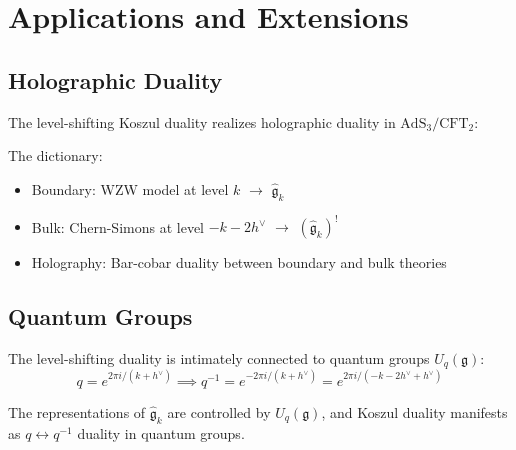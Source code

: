 \section{Applications and Extensions}

\subsection{Holographic Duality}

\begin{theorem}\label{thm:km-holography}
The level-shifting Koszul duality realizes holographic duality in $\mathrm{AdS}_3/\mathrm{CFT}_2$:
\begin{center}
\end{center}

The dictionary:
\begin{itemize}
\item Boundary: WZW model at level $k$ $\to$ $\widehat{\mathfrak{g}}_k$
\item Bulk: Chern-Simons at level $-k-2h^\vee$ $\to$ $(\widehat{\mathfrak{g}}_k)^!$
\item Holography: Bar-cobar duality between boundary and bulk theories
\end{itemize}
\end{theorem}

\subsection{Quantum Groups}

\begin{theorem}
The level-shifting duality is intimately connected to quantum groups $U_q(\mathfrak{g})$:
\begin{equation}
q = e^{2\pi i/(k+h^\vee)} \implies q^{-1} = e^{-2\pi i/(k+h^\vee)} = e^{2\pi i/(-k-2h^\vee+h^\vee)}
\end{equation}

The representations of $\widehat{\mathfrak{g}}_k$ are controlled by $U_q(\mathfrak{g})$, and Koszul duality manifests as $q \leftrightarrow q^{-1}$ duality in quantum groups.
\end{theorem}

